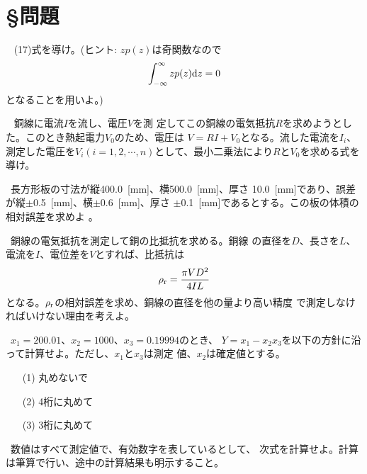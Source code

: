 \documentclass[11pt,a4,epsf]{jarticle}
\begin{document}
\section*{\S 問題}

\bigskip
\noindent {\bf [問題1]}~
(17)式を導け。(ヒント: $zp(z)$は奇関数なので
\begin{displaymath}
\int_{-\infty}^{\infty} zp(z){\rm d}z = 0
\end{displaymath}
となることを用いよ。)

\bigskip

\noindent {\bf [問題2]}~
銅線に電流$I$を流し、電圧$V$を測
定してこの銅線の電気抵抗$R$を求めようとした。このとき熱起電力$V_0$のため、電圧は
$V=RI+V_0$となる。流した電流を$I_i$、測定した電圧を$V_i(i=1, 2, \cdots,
n)$として、最小二乗法により$R$と$V_0$を求める式を導け。


\bigskip

\noindent {\bf [問題3]}~長方形板の寸法が縦400.0~[mm]、横500.0~[mm]、厚さ
10.0~[mm]であり、誤差が縦$\pm$0.5~[mm]、横$\pm$0.6~[mm]、厚さ
$\pm$0.1~[mm]であるとする。この板の体積の相対誤差を求めよ 。

\bigskip

\noindent {\bf [問題4]}~銅線の電気抵抗を測定して銅の比抵抗を求める。銅線
の直径を$D$、長さを$L$、電流を$I$、電位差を$V$とすれば、比抵抗は
\begin{displaymath}
\rho_{\rm r} = {\pi VD^2 \over 4IL}
\end{displaymath}
となる。$\rho_{\rm r}$の相対誤差を求め、銅線の直径を他の量より高い精度
で測定しなければいけない理由を考えよ。

\bigskip

\noindent {\bf [問題5]}~$x_1=200.01$、$x_2=1000$、$x_3=0.19994$のとき、
$Y=x_1 - x_2x_3$を以下の方針に沿って計算せよ。ただし、$x_1$と$x_3$は測定
値、$x_2$は確定値とする。

\begin{itemize}

\item[(1)]丸めないで

\item[(2)]4桁に丸めて

\item[(3)]3桁に丸めて

\end{itemize}


\noindent {\bf [問題6]}~数値はすべて測定値で、有効数字を表しているとして、
次式を計算せよ。計算は筆算で行い、途中の計算結果も明示すること。
\end{document}

